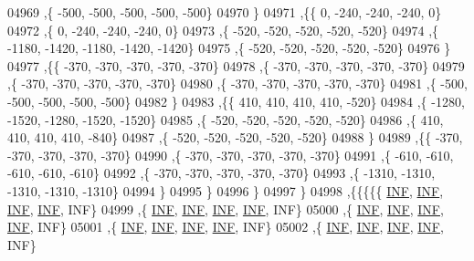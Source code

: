 \begin{DoxyCode}
04969     ,\{  -500,  -500,  -500,  -500,  -500\}
04970     \}
04971    ,\{\{     0,  -240,  -240,  -240,     0\}
04972     ,\{     0,  -240,  -240,  -240,     0\}
04973     ,\{  -520,  -520,  -520,  -520,  -520\}
04974     ,\{ -1180, -1420, -1180, -1420, -1420\}
04975     ,\{  -520,  -520,  -520,  -520,  -520\}
04976     \}
04977    ,\{\{  -370,  -370,  -370,  -370,  -370\}
04978     ,\{  -370,  -370,  -370,  -370,  -370\}
04979     ,\{  -370,  -370,  -370,  -370,  -370\}
04980     ,\{  -370,  -370,  -370,  -370,  -370\}
04981     ,\{  -500,  -500,  -500,  -500,  -500\}
04982     \}
04983    ,\{\{   410,   410,   410,   410,  -520\}
04984     ,\{ -1280, -1520, -1280, -1520, -1520\}
04985     ,\{  -520,  -520,  -520,  -520,  -520\}
04986     ,\{   410,   410,   410,   410,  -840\}
04987     ,\{  -520,  -520,  -520,  -520,  -520\}
04988     \}
04989    ,\{\{  -370,  -370,  -370,  -370,  -370\}
04990     ,\{  -370,  -370,  -370,  -370,  -370\}
04991     ,\{  -610,  -610,  -610,  -610,  -610\}
04992     ,\{  -370,  -370,  -370,  -370,  -370\}
04993     ,\{ -1310, -1310, -1310, -1310, -1310\}
04994     \}
04995    \}
04996   \}
04997  \}
04998 ,\{\{\{\{\{   \hyperlink{constants_8h_a12c2040f25d8e3a7b9e1c2024c618cb6}{INF},   \hyperlink{constants_8h_a12c2040f25d8e3a7b9e1c2024c618cb6}{INF},   \hyperlink{constants_8h_a12c2040f25d8e3a7b9e1c2024c618cb6}{INF},   \hyperlink{constants_8h_a12c2040f25d8e3a7b9e1c2024c618cb6}{INF},   INF\}
04999     ,\{   \hyperlink{constants_8h_a12c2040f25d8e3a7b9e1c2024c618cb6}{INF},   \hyperlink{constants_8h_a12c2040f25d8e3a7b9e1c2024c618cb6}{INF},   \hyperlink{constants_8h_a12c2040f25d8e3a7b9e1c2024c618cb6}{INF},   \hyperlink{constants_8h_a12c2040f25d8e3a7b9e1c2024c618cb6}{INF},   INF\}
05000     ,\{   \hyperlink{constants_8h_a12c2040f25d8e3a7b9e1c2024c618cb6}{INF},   \hyperlink{constants_8h_a12c2040f25d8e3a7b9e1c2024c618cb6}{INF},   \hyperlink{constants_8h_a12c2040f25d8e3a7b9e1c2024c618cb6}{INF},   \hyperlink{constants_8h_a12c2040f25d8e3a7b9e1c2024c618cb6}{INF},   INF\}
05001     ,\{   \hyperlink{constants_8h_a12c2040f25d8e3a7b9e1c2024c618cb6}{INF},   \hyperlink{constants_8h_a12c2040f25d8e3a7b9e1c2024c618cb6}{INF},   \hyperlink{constants_8h_a12c2040f25d8e3a7b9e1c2024c618cb6}{INF},   \hyperlink{constants_8h_a12c2040f25d8e3a7b9e1c2024c618cb6}{INF},   INF\}
05002     ,\{   \hyperlink{constants_8h_a12c2040f25d8e3a7b9e1c2024c618cb6}{INF},   \hyperlink{constants_8h_a12c2040f25d8e3a7b9e1c2024c618cb6}{INF},   \hyperlink{constants_8h_a12c2040f25d8e3a7b9e1c2024c618cb6}{INF},   \hyperlink{constants_8h_a12c2040f25d8e3a7b9e1c2024c618cb6}{INF},   INF\}

\end{DoxyCode}

